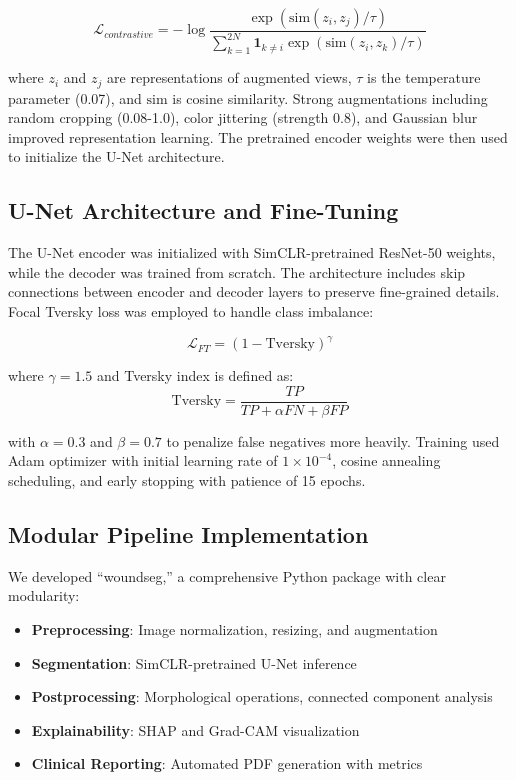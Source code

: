 \documentclass[conference]{IEEEtran}
\begin{document}
\begin{equation}
\mathcal{L}_{contrastive} = -\log \frac{\exp(\text{sim}(z_i, z_j)/\tau)}{\sum_{k=1}^{2N} \mathbf{1}_{k \neq i} \exp(\text{sim}(z_i, z_k)/\tau)}
\end{equation}

where $z_i$ and $z_j$ are representations of augmented views, $\tau$ is the temperature parameter (0.07), and $\text{sim}$ is cosine similarity. Strong augmentations including random cropping (0.08-1.0), color jittering (strength 0.8), and Gaussian blur improved representation learning. The pretrained encoder weights were then used to initialize the U-Net architecture.

\subsection{U-Net Architecture and Fine-Tuning}
The U-Net encoder was initialized with SimCLR-pretrained ResNet-50 weights, while the decoder was trained from scratch. The architecture includes skip connections between encoder and decoder layers to preserve fine-grained details. Focal Tversky loss was employed to handle class imbalance:

\begin{equation}
\mathcal{L}_{FT} = (1 - \text{Tversky})^{\gamma}
\end{equation}

where $\gamma = 1.5$ and Tversky index is defined as:
\begin{equation}
\text{Tversky} = \frac{TP}{TP + \alpha FN + \beta FP}
\end{equation}

with $\alpha = 0.3$ and $\beta = 0.7$ to penalize false negatives more heavily. Training used Adam optimizer with initial learning rate of $1 \times 10^{-4}$, cosine annealing scheduling, and early stopping with patience of 15 epochs.

\subsection{Modular Pipeline Implementation}
We developed ``woundseg,'' a comprehensive Python package with clear modularity:

\begin{itemize}
\item \textbf{Preprocessing}: Image normalization, resizing, and augmentation
\item \textbf{Segmentation}: SimCLR-pretrained U-Net inference
\item \textbf{Postprocessing}: Morphological operations, connected component analysis
\item \textbf{Explainability}: SHAP and Grad-CAM visualization
\item \textbf{Clinical Reporting}: Automated PDF generation with metrics
\end{itemize}
\end{document}

